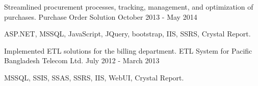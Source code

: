 \begin{cventries}
  \cventry
    {Streamlined procurement processes, tracking, management, and optimization of purchases.} %
    {Purchase Order Solution } %
    {October 2013 - May 2014} %
    {} %
    {
      \begin{cvitems} %
        \item {ASP.NET, MSSQL, JavaScript, JQuery, bootstrap, IIS, SSRS, Crystal Report.}
      \end{cvitems}
    }
  \cventry
    {Implemented ETL solutions for the billing department.} %
    {ETL System for Pacific Bangladesh Telecom Ltd.} %
    {July 2012 - March 2013} %
    {} %
    {
      \begin{cvitems} %
        \item {MSSQL, SSIS, SSAS, SSRS, IIS, WebUI, Crystal Report.}
      \end{cvitems}
    }

\end{cventries}
